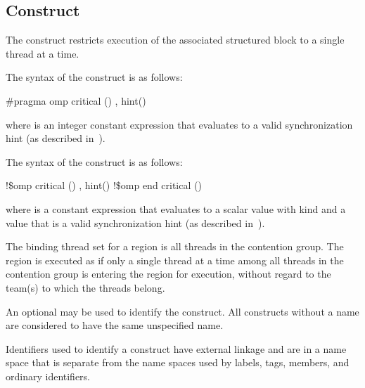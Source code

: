 \subsection{ Construct}
\label{subsec:critical Construct}
\summary
The  construct restricts execution of the associated structured block to a 
single thread at a time.

\syntax
\begin{ccppspecific}
The syntax of the  construct is as follows:

\begin{boxedcode}
  \#pragma omp critical \plc{[}() \plc{[[},\plc{]} hint()\plc{] ] new-line}
\end{boxedcode}

where  is an integer constant expression that
evaluates to a valid synchronization hint (as described in~).
\end{ccppspecific}

\begin{fortranspecific}
The syntax of the  construct is as follows:

\begin{boxedcode}
!\$omp critical \plc{[}() \plc{[[},\plc{]} hint()\plc{] ]}
!\$omp end critical \plc{[}()\plc{]}  
\end{boxedcode}

where  is a constant expression that evaluates to
a scalar value with kind  and  a value
that is a valid synchronization hint (as described 
in~).
\end{fortranspecific}

\binding
The binding thread set for a  region is all threads in the contention group. 
The region is executed as if only a single thread at a time among all threads in the 
contention group is entering the region for execution, without regard to the team(s) to which the threads belong. 

\descr
An optional  may be used to identify the  construct. All  
constructs without a name are considered to have the same unspecified name. 

\begin{ccppspecific}
Identifiers used to identify a  construct have external linkage and are in a 
name space that is separate from the name spaces used by labels, tags, members, and 
ordinary identifiers.
\end{ccppspecific}

